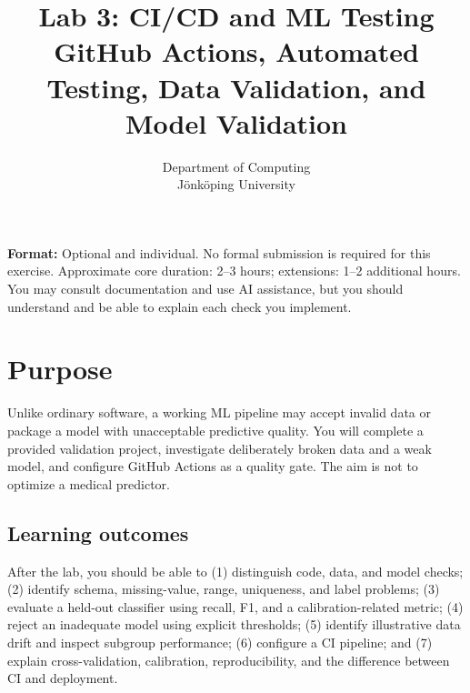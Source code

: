 \documentclass[11pt,a4paper]{article}
\title{Lab 3: CI/CD and ML Testing\\\large GitHub Actions, Automated Testing, Data Validation, and Model Validation}
\author{Department of Computing\\J\"onk\"oping University}
\date{}
\begin{document}
\maketitle
\vspace{-1.5em}
\noindent\textbf{Format:} Optional and individual. No formal submission is required for this exercise. Approximate core duration: 2--3 hours; extensions: 1--2 additional hours. You may consult documentation and use AI assistance, but you should understand and be able to explain each check you implement.
\section{Purpose}
Unlike ordinary software, a working ML pipeline may accept invalid data or package a model with unacceptable predictive quality. You will complete a provided validation project, investigate deliberately broken data and a weak model, and configure GitHub Actions as a quality gate. The aim is not to optimize a medical predictor.
\subsection*{Learning outcomes}
After the lab, you should be able to (1) distinguish code, data, and model checks; (2) identify schema, missing-value, range, uniqueness, and label problems; (3) evaluate a held-out classifier using recall, F1, and a calibration-related metric; (4) reject an inadequate model using explicit thresholds; (5) identify illustrative data drift and inspect subgroup performance; (6) configure a CI pipeline; and (7) explain cross-validation, calibration, reproducibility, and the difference between CI and deployment.
\end{document}
